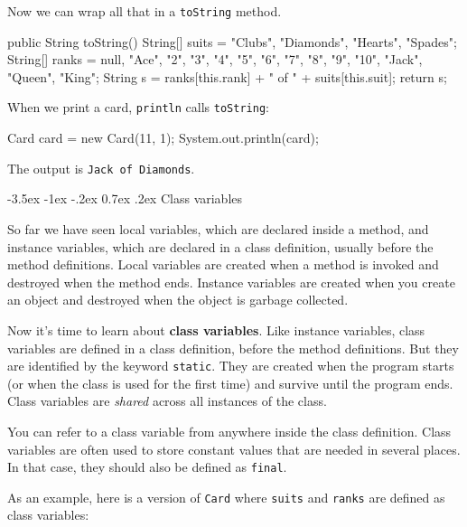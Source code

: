 \documentclass[12pt]{book}
\makeatletter
\theoremstyle{exercise}
\newcommand{\java}[1]{\verb"#1"}
\renewcommand{\section}{\@startsection{section}{1}{\z@}%
    {-3.5ex \@plus -1ex \@minus -.2ex}%
    {0.7ex \@plus.2ex}%
    {\normalfont\Large\bfseries}}
\newcommand{\java}[1]{\lstinline{#1}} %
\makeatother
\begin{document}
Now we can wrap all that in a \java{toString} method.

\begin{code}
public String toString() {
    String[] suits = {"Clubs", "Diamonds", "Hearts", "Spades"};
    String[] ranks = {null, "Ace", "2", "3", "4", "5", "6",
               "7", "8", "9", "10", "Jack", "Queen", "King"};
    String s = ranks[this.rank] + " of " + suits[this.suit];
    return s;
}
\end{code}

When we print a card, \java{println} calls \java{toString}:

\begin{code}
    Card card = new Card(11, 1);
    System.out.println(card);
\end{code}

The output is {\tt Jack of Diamonds}.


\section{Class variables}
\label{classvar}

So far we have seen local variables, which are declared inside a method, and instance variables, which are declared in a class definition, usually before the method definitions.
Local variables are created when a method is invoked and destroyed when the method ends.
Instance variables are created when you create an object and destroyed when the object is garbage collected.


Now it's time to learn about {\bf class variables}.
Like instance variables, class variables are defined in a class definition, before the method definitions.
But they are identified by the keyword \java{static}.
They are created when the program starts (or when the class is used for the first time) and survive until the program ends.
Class variables are {\em shared} across all instances of the class.

You can refer to a class variable from anywhere inside the class definition.
Class variables are often used to store constant values that are needed in several places.
In that case, they should also be defined as \java{final}.


As an example, here is a version of \java{Card} where \java{suits} and \java{ranks} are defined as class variables:
\end{document}
